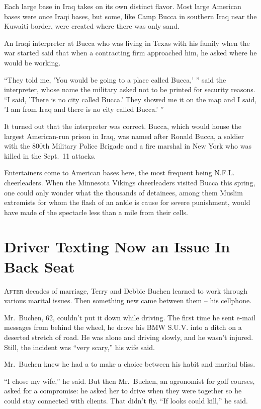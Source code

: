 ﻿\documentclass[12pt]{article}
\begin{document}
Each large base in Iraq takes on its own distinct flavor. Most large American bases were once Iraqi
bases, but some, like Camp Bucca in southern Iraq near the Kuwaiti border, were created where there
was only sand.

An Iraqi interpreter at Bucca who was living in Texas with his family when the war started said that
when a contracting firm approached him, he asked where he would be working.

``They told me, 'You would be going to a place called Bucca,' '' said the interpreter, whose name
the military asked not to be printed for security reasons. ``I said, 'There is no city called
Bucca.' They showed me it on the map and I said, 'I am from Iraq and there is no city called Bucca.'
''

It turned out that the interpreter was correct. Bucca, which would house the largest American-run
prison in Iraq, was named after Ronald Bucca, a soldier with the 800th Military Police Brigade and a
fire marshal in New York who was killed in the Sept.~11 attacks.

Entertainers come to American bases here, the most frequent being N.F.L. cheerleaders. When the
Minnesota Vikings cheerleaders visited Bucca this spring, one could only wonder what the thousands
of detainees, among them Muslim extremists for whom the flash of an ankle is cause for severe
punishment, would have made of the spectacle less than a mile from their cells.

\section{Driver Texting Now an Issue In Back Seat}

\lettrine{A}{fter} decades of marriage, Terry and Debbie Buchen learned to work through various
marital\cite{marital} issues. Then something new came between them -- his cellphone.

Mr.~Buchen, 62, couldn't put it down while driving. The first time he sent e-mail messages from
behind the wheel, he drove his BMW S.U.V. into a ditch on a deserted stretch of road. He was alone
and driving slowly, and he wasn't injured. Still, the incident was ``very scary,'' his wife said.

Mr.~Buchen knew he had a to make a choice between his habit and marital bliss\cite{bliss}.

``I chose my wife,'' he said. But then Mr.~Buchen, an agronomist for golf courses, asked for a
compromise: he asked her to drive when they were together so he could stay connected with clients.
That didn't fly. ``If looks could kill,'' he said.
\end{document}
